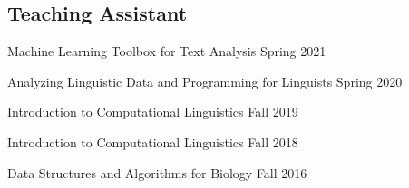 \subsection{Teaching Assistant}

Machine Learning Toolbox for Text Analysis \hfill Spring 2021

Analyzing Linguistic Data and Programming for Linguists \hfill Spring 2020

Introduction to Computational Linguistics \hfill Fall 2019

Introduction to Computational Linguistics \hfill Fall 2018

Data Structures and Algorithms for Biology \hfill Fall 2016

\phantom{Phantom text to fix alignment issue in previous line}